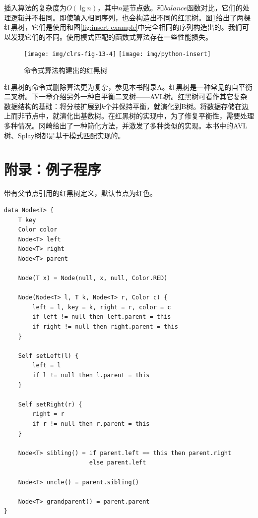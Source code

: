 \documentclass[b5paper]{ctexart}
\begin{document}
插入算法的复杂度为$O(\lg n)$，其中$n$是节点数。和$balance$函数对比，它们的处理逻辑并不相同。即使输入相同序列，也会构造出不同的红黑树。图\ref{fig:imperative-insert}给出了两棵红黑树，它们是使用和图\ref{fig:insert-example}中完全相同的序列构造出的。我们可以发现它们的不同。使用模式匹配的函数式算法存在一些性能损失\cite{okasaki}。

\begin{figure}[htbp]
   \centering
   \texttt{[image: img/clrs-fig-13-4]}
   \texttt{[image: img/python-insert]}
   \caption{命令式算法构建出的红黑树}
   \label{fig:imperative-insert}
\end{figure}

红黑树的命令式删除算法更为复杂，参见本书附录A。红黑树是一种常见的自平衡二叉树。下一章介绍另外一种自平衡二叉树——AVL树。红黑树可看作其它复杂数据结构的基础：将分枝扩展到$k$个并保持平衡，就演化到B树。将数据存储在边上而非节点中，就演化出基数树。在红黑树的实现中，为了修复平衡性，需要处理多种情况。冈崎给出了一种简化方法，并激发了多种类似的实现\cite{rosetta}。本书中的AVL树、Splay树都是基于模式匹配实现的。

\section{附录：例子程序}

带有父节点引用的红黑树定义，默认节点为红色。

\begin{lstlisting}[language = Bourbaki]
data Node<T> {
    T key
    Color color
    Node<T> left
    Node<T> right
    Node<T> parent

    Node(T x) = Node(null, x, null, Color.RED)

    Node(Node<T> l, T k, Node<T> r, Color c) {
        left = l, key = k, right = r, color = c
        if left != null then left.parent = this
        if right != null then right.parent = this
    }

    Self setLeft(l) {
        left = l
        if l != null then l.parent = this
    }

    Self setRight(r) {
        right = r
        if r != null then r.parent = this
    }

    Node<T> sibling() = if parent.left == this then parent.right
                        else parent.left

    Node<T> uncle() = parent.sibling()

    Node<T> grandparent() = parent.parent
}
\end{lstlisting}
\end{document}
